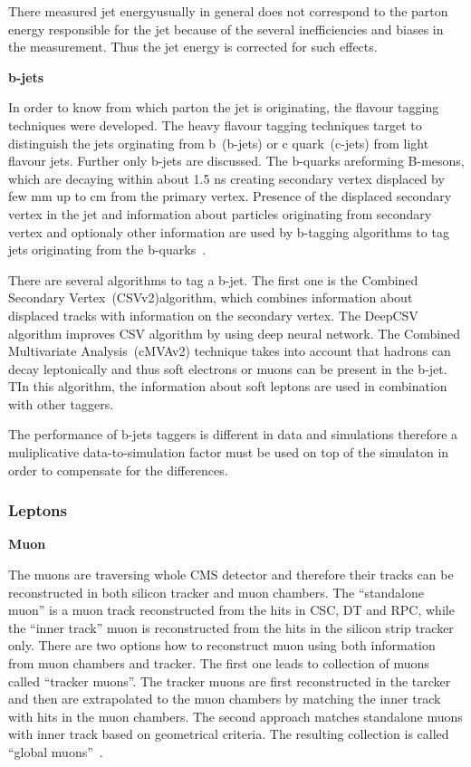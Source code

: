There measured jet energyusually in general does not correspond to the parton energy responsible for the jet because of the several inefficiencies and biases in the measurement. Thus the jet energy is corrected for such effects.

\textbf{b-jets}

In order to know from which parton the jet is originating, the flavour tagging techniques were developed. The heavy flavour tagging techniques target to distinguish the jets orginating from b~(b-jets) or c quark~(c-jets) from light flavour jets. Further only b-jets are discussed. The b-quarks areforming B-mesons, which are decaying within about 1.5 ns creating secondary vertex displaced by few mm up to cm from the primary vertex. Presence of the displaced secondary vertex in the jet and information about particles originating from secondary vertex and optionaly other information are used by b-tagging algorithms to tag jets originating from the b-quarks~\cite{Sirunyan:2017ezt}.

There are several algorithms to tag a b-jet. The first one is the Combined Secondary Vertex~(CSVv2)algorithm, which combines information about displaced tracks with information on the secondary vertex. The DeepCSV algorithm improves CSV algorithm by using deep neural network. The Combined Multivariate Analysis~(cMVAv2) technique takes into account that hadrons can decay leptonically and thus soft electrons or muons can be present in the b-jet. TIn this algorithm, the information about soft leptons are used in combination with other taggers.

The performance of b-jets taggers is different in data and simulations therefore a muliplicative data-to-simulation factor must be used on top of the simulaton in order to compensate for the differences.

\subsubsection{Leptons}

\textbf{Muon}

The muons are traversing whole CMS detector and therefore their tracks can be reconstructed in both silicon tracker and muon chambers. The ``standalone muon'' is a muon track reconstructed from the hits in CSC, DT and RPC, while the ``inner track'' muon is reconstructed from the hits in the silicon strip tracker only. There are two options how to reconstruct muon using both information from muon chambers and tracker. The first one leads to collection of muons called ``tracker muons''.  The tracker muons are first reconstructed in the tarcker and then are extrapolated to the muon chambers by matching the inner track with hits in the muon chambers. The second approach matches standalone
muons with inner track based on geometrical criteria. The resulting collection is called ``global muons''~\cite{Chatrchyan:2012xi}. 

